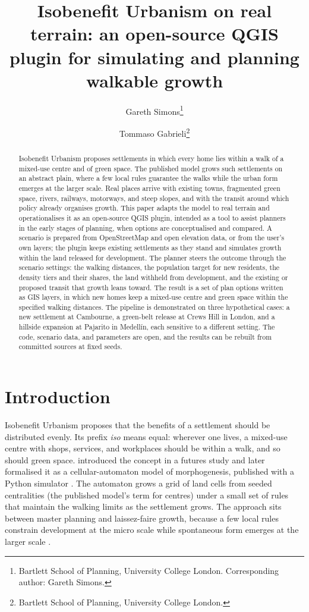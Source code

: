 \documentclass[11pt]{article}
\title{Isobenefit Urbanism on real terrain: an open-source QGIS plugin
for simulating and planning walkable growth}
\author{%
  Gareth Simons\thanks{Bartlett School of Planning, University College
  London. Corresponding author: Gareth Simons.}
\and Tommaso Gabrieli\thanks{Bartlett School of Planning, University
  College London.}}
\date{}
\begin{document}
\maketitle

\begin{abstract}
  \noindent
  Isobenefit Urbanism proposes settlements in which every home lies
  within a walk of a mixed-use centre and of green space. The published
  model grows such settlements on an abstract plain, where a few local rules guarantee the walks while the urban form emerges at the larger scale. Real places arrive
  with existing towns, fragmented green space, rivers, railways,
  motorways, and steep slopes, and with the transit around which policy
  already organises growth. This paper adapts the model to real terrain and operationalises it as an open-source QGIS plugin, intended as a tool to assist planners in the early stages of planning, when options are conceptualised and compared. A
  scenario is prepared from OpenStreetMap and open elevation data, or
  from the user's own layers; the plugin keeps existing settlements as
  they stand and simulates growth within the land released for
  development. The
  planner steers the outcome through the scenario settings: the walking
  distances, the population target for new residents, the density tiers
  and their shares, the land withheld from development, and the
  existing or proposed transit that growth leans toward. The result
  is a set of plan options written as GIS layers, in which new homes
  keep a mixed-use centre and green space within the specified
  walking distances. The pipeline is demonstrated on three
  hypothetical cases: a new settlement at Cambourne, a green-belt
  release at Crews Hill in London, and a hillside expansion at
  Pajarito in Medell\'in, each sensitive to a different setting. The code, scenario data, and
  parameters are open, and the results can be rebuilt from committed
  sources at fixed seeds.
\end{abstract}

\section{Introduction}

Isobenefit Urbanism \citep{dacci2019} proposes that the benefits of a
settlement should be distributed evenly. Its prefix \emph{iso} means
equal: wherever one lives, a mixed-use centre with shops, services, and
workplaces should be within a walk, and so should green space.
\citet{dacci2013} introduced the concept in a futures study and later
formalised it as a cellular-automaton model of morphogenesis, published
with a Python simulator \citep{dacci_voto2023,voto_code}. The automaton
grows a grid of land cells from seeded centralities (the published
model's term for centres) under a small set of rules that maintain
the walking limits as the settlement grows. The approach sits between master planning and
laissez-faire growth, because a few local rules constrain development at the micro scale while spontaneous form emerges at the larger scale \citep{dacci_banister_white2024}.
\end{document}
